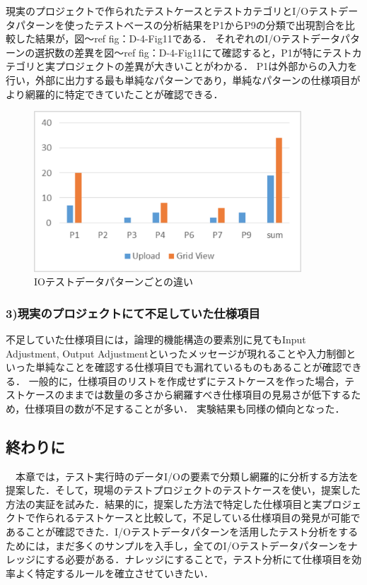 \documentclass[a4paper,10pt]{jreport}
\begin{document}
現実のプロジェクトで作られたテストケースとテストカテゴリとI/Oテストデータパターンを使ったテストベースの分析結果をP1からP9の分類で出現割合を比較した結果が，図〜ref {fig：D-4-Fig11}である．
それぞれのI/Oテストデータパターンの選択数の差異を図〜ref {fig：D-4-Fig11}にて確認すると，P1が特にテストカテゴリと実プロジェクトの差異が大きいことがわかる．
P1は外部からの入力を行い，外部に出力する最も単純なパターンであり，単純なパターンの仕様項目がより網羅的に特定できていたことが確認できる．
   \begin{figure}[htbp]
  \begin{center}
  \includegraphics[width=10cm]{./image/D-4-Fig11.png}
  \caption{IOテストデータパターンごとの違い}
  \label{fig:D-4-Fig11}
  \end{center}
   \end{figure}


\subsubsection{3)現実のプロジェクトにて不足していた仕様項目}
%

不足していた仕様項目には，論理的機能構造の要素別に見てもInput Adjustment, Output Adjustmentといったメッセージが現れることや入力制御といった単純なことを確認する仕様項目でも漏れているものもあることが確認できる．
一般的に，仕様項目のリストを作成せずにテストケースを作った場合，テストケースのままでは数量の多さから網羅すべき仕様項目の見易さが低下するため，仕様項目の数が不足することが多い．
実験結果も同様の傾向となった．

\subsection{終わりに}
　本章では，テスト実行時のデータI/Oの要素で分類し網羅的に分析する方法を提案した．そして，現場のテストプロジェクトのテストケースを使い，提案した方法の実証を試みた．結果的に，提案した方法で特定した仕様項目と実プロジェクトで作られるテストケースと比較して，不足している仕様項目の発見が可能であることが確認できた．I/Oテストデータパターンを活用したテスト分析をするためには，まだ多くのサンプルを入手し，全てのI/Oテストデータパターンをナレッジにする必要がある．ナレッジにすることで，テスト分析にて仕様項目を効率よく特定するルールを確立させていきたい．
\end{document}
